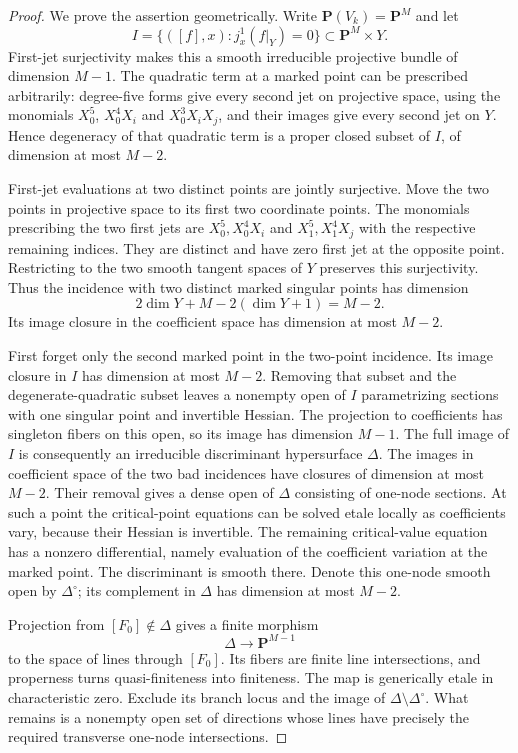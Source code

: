 \begin{proof}
We prove the assertion geometrically.  Write
$\mathbf P(V_k)=\mathbf P^M$ and let
\[
 I=\{([f],x):j_x^1(f|_Y)=0\}\subset\mathbf P^M\times Y.
 \tag{CG18.3}\label{r18cg:incidence}
\]
First-jet surjectivity makes this a smooth irreducible projective
bundle of dimension $M-1$.  The quadratic term at a marked point
can be prescribed arbitrarily: degree-five forms give every
second jet on projective space, using the monomials
$X_0^5$, $X_0^4X_i$ and $X_0^3X_iX_j$, and their images give
every second jet on $Y$.  Hence degeneracy of that quadratic
term is a proper closed subset of $I$, of dimension at most
$M-2$.

First-jet evaluations at two distinct points are jointly
surjective.  Move the two points in projective space to its
first two coordinate points.  The monomials prescribing the
two first jets are $X_0^5,X_0^4X_i$ and
$X_1^5,X_1^4X_j$ with the respective remaining indices.
They are distinct and have zero first jet at the opposite
point.  Restricting to the two smooth tangent spaces of $Y$
preserves this surjectivity.  Thus the incidence with two
distinct marked singular points has dimension
\[
          2\dim Y+M-2(\dim Y+1)=M-2.
\]
Its image closure in the coefficient space has dimension at
most $M-2$.

First forget only the second marked point in the two-point
incidence.  Its image closure in $I$ has dimension at most
$M-2$.  Removing that subset and the degenerate-quadratic
subset leaves a nonempty open of $I$ parametrizing sections
with one singular point and invertible Hessian.  The projection
to coefficients has singleton fibers on this open, so its image
has dimension $M-1$.  The full image of $I$ is consequently an
irreducible discriminant hypersurface $\Delta$.
The images in coefficient space of the two bad incidences
have closures of dimension at most $M-2$.  Their removal
gives a dense open of $\Delta$ consisting of one-node sections.
At such a point the critical-point equations can be solved
etale locally as coefficients vary, because their Hessian is
invertible.  The remaining critical-value equation has a
nonzero differential, namely evaluation of the coefficient
variation at the marked point.  The discriminant is smooth
there.  Denote this one-node smooth open by $\Delta^\circ$;
its complement in $\Delta$ has dimension at most $M-2$.

Projection from $[F_0]\notin\Delta$ gives a finite morphism
\[
                         \Delta\longrightarrow\mathbf P^{M-1}
\]
to the space of lines through $[F_0]$.  Its fibers are finite
line intersections, and properness turns quasi-finiteness into
finiteness.  The map is generically etale in characteristic
zero.  Exclude its branch locus and the image of
$\Delta\setminus\Delta^\circ$.  What remains is a nonempty
open set of directions whose lines have precisely the required
transverse one-node intersections.


\end{proof}
